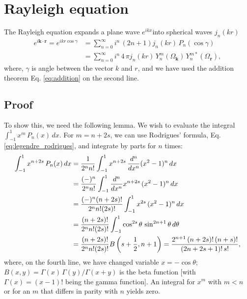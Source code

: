 \documentclass[11pt]{article}
\newcommand{\vct}[1]{\boldsymbol{\mathbf{#1}}}
\newcommand{\vr}{\vct{r}}
\newcommand{\vk}{\vct{k}}
\begin{document}
\section{\label{sec:rayleigh}Rayleigh equation}



The Rayleigh equation expands a plane wave $e^{i k x}$into spherical waves $j_n(kr)$
\begin{align}
  e^{i\vk \cdot \vr}
=
  e^{ikr\cos\gamma}
&=
  \sum_{n = 0}^\infty
i^n \, ( 2 n + 1 )
j_n(k r) \, P_n(\cos\gamma)
\label{eq:rayleigh} \\
&=
  \sum_{n = 0}^\infty
i^n \, 4 \, \pi
j_n(k r) \, Y_n^m(\Omega_{\vk}) \, Y_n^{m*}(\Omega_{\vr}),
\label{eq:rayleigh_yy}
\end{align}
where, $\gamma$ is angle between the vector $k$ and $r$,
and we have used the addition theorem Eq. \eqref{eq:addition}
on the second line.



\subsection{\label{sec:rayleigh_proof}Proof}



To show this, we need the following lemma.
%
We wish to evaluate the integral
$\int_{-1}^1 x^m \, P_n(x) \, dx$.
%
For $m = n + 2 s$, we can use
Rodrigues' formula, Eq. \eqref{eq:legendre_rodrigues},
and integrate by parts for $n$ times:
\begin{align*}
\int_{-1}^1 x^{n + 2s} \, P_n(x) \, dx
&=
\frac{ 1 } { 2^n n! }
\int_{-1}^1 x^{n + 2 s} \,
\frac{d^n}{dx^n} (x^2 - 1)^n \, dx
\notag \\
&=
\frac{ (-)^n } { 2^n n! }
\int_{-1}^1 \frac{d^n}{dx^n} x^{n + 2 s} \,
(x^2 - 1)^n \, dx
\notag \\
&=
\frac{ (-)^n (n + 2 s)! } { 2^n n! (2 s)! }
\int_{-1}^1 x^{2 s} \,
(x^2 - 1)^n \, dx
\notag \\
&=
\frac{ (n + 2 s)! } { 2^n n! (2 s)! }
\int_{-1}^1 \cos^{2 s}\theta \,
\sin^{2n + 1}\theta \, d\theta
\notag \\
&=
\frac{ (n + 2 s)! } { 2^n n! (2 s)! }
B\left(s + \frac{1}{2}, n + 1\right)
=
\frac{ 2^{n+1} \, (n + 2 s)! \, (n + s)! } { (2 n + 2 s + 1)! \, s! },
\notag \\
\end{align*}
where,
on the fourth line,
we have changed variable $x = -\cos\theta$;
%
$B(x, y) = \Gamma(x) \, \Gamma(y) / \Gamma(x + y)$
is the beta function
[with $\Gamma(x) = (x-1)!$ being the gamma function].
%
An integral for $x^m$ with $m < n$
or for an $m$ that differs in parity with $n$
yields zero.
\end{document}
